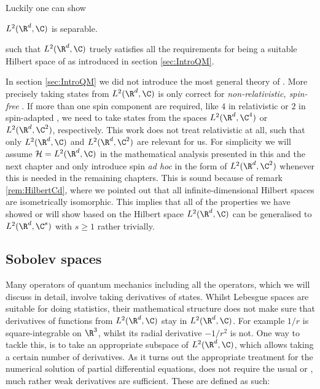 \noindent
Luckily one can show~
\begin{prop}
	$L^2(\R^d, \C)$ is separable.
\end{prop}
\noindent
such that $L^2(\R^d, \C)$ truely satisfies all the requirements
for being a suitable Hilbert space of \QM
as introduced in section \vref{sec:IntroQM}.

In section \ref{sec:IntroQM} we did not introduce the most general theory of \QM.
More precisely taking states from $L^2(\R^d, \C)$
is only correct for \emph{non-relativistic, spin-free} \QM.
If more than one spin component are required,
like $4$ in relativistic \QM or $2$ in spin-adapted \QM,
we need to take states from the spaces $L^2(\R^d, \C^4)$ or $L^2(\R^d, \C^2)$,
respectively.
This work does not treat relativistic \QM at all,
such that only $L^2(\R^d, \C)$ and $L^2(\R^d, \C^2)$ are relevant for us.
For simplicity we will assume $\hilbert = L^2(\R^d, \C)$
in the mathematical analysis presented in this and the next chapter
and only introduce spin \textit{ad hoc} in the form of $L^2(\R^d, \C^2)$
whenever this is needed in the remaining chapters.
This is sound because of remark \vref{rem:HilbertCd},
where we pointed out that all infinite-dimensional
Hilbert spaces are isometrically isomorphic.
This implies that all of the properties we have showed or will show based
on the Hilbert space $L^2(\R^d, \C)$ can be generalised
to $L^2(\R^d, \C^s)$ with $s \geq 1$ rather trivially.

\subsection{Sobolev spaces}
\label{sec:Sobolev}
Many operators of quantum mechanics including all the operators,
which we will discuss in detail, involve taking derivatives of states.
Whilst Lebesgue spaces are suitable for doing statistics,
their mathematical structure does not make sure
that derivatives of functions from $L^2(\R^d, \C)$ stay in $L^2(\R^d, \C)$.
For example $1/r$ is square-integrable on $\R^3$,
whilst its radial derivative $-1/r^2$ is not.
One way to tackle this, is to take an appropriate subspace of $L^2(\R^d, \C)$,
which allows taking a certain number of derivatives.
As it turns out the appropriate treatment for the numerical solution
of partial differential equations,
does not require the usual or ,
much rather weak derivatives are sufficient.
These are defined as such:

